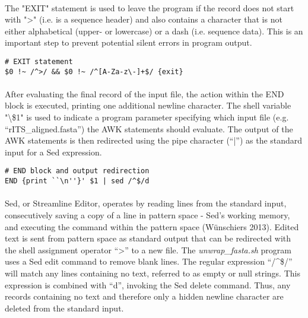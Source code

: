 \vspace*{36pt}


\paragraph{} The "EXIT" statement is used to leave the program if the record does not start with ">" (i.e. is a sequence header) and also contains a character that is not either alphabetical (upper- or lowercase) or a dash (i.e. sequence data).  This is an important step to prevent potential silent errors in program output.  

\clearpage

\begin{lstlisting}[caption={\textit{unwrap\_fasta.sh} AWK EXIT statement}]
# EXIT statement
$0 !~ /^>/ && $0 !~ /^[A-Za-z\-]+$/ {exit}
\end{lstlisting}

\vspace*{30pt}

\paragraph{} After evaluating the final record of the input file, the action within the END block is executed, printing one additional newline character.  The shell variable "\textbackslash\$1" is used to indicate a program parameter specifying which input file (e.g. ``rITS\_aligned.fasta”) the AWK statements should evaluate.  The output of the AWK statements is then redirected using the pipe character (``|”) as the standard input for a Sed expression.

\vspace*{30pt}

\begin{lstlisting}[caption={AWK END Block and Sed Redirection}]
# END block and output redirection
END {print ``\n''}' $1 | sed /^$/d
\end{lstlisting}

\vspace*{30pt}

\paragraph{} Sed, or Streamline Editor, operates by reading lines from the standard input, consecutively saving a copy of a line in pattern space - Sed’s working memory, and executing the command within the pattern space (Wünschiers 2013).  Edited text is sent from pattern space as standard output that can be redirected with the shell assignment operator ``>” to a new file.  The \textit{unwrap\_fasta.sh} program uses a Sed edit command to remove blank lines.  The regular expression ``/\string^\$/” will match any lines containing no text, referred to as empty or null strings.  This expression is combined with ``d”, invoking the Sed delete command.  Thus, any records containing no text and therefore only a hidden newline character are deleted from the standard input.  

